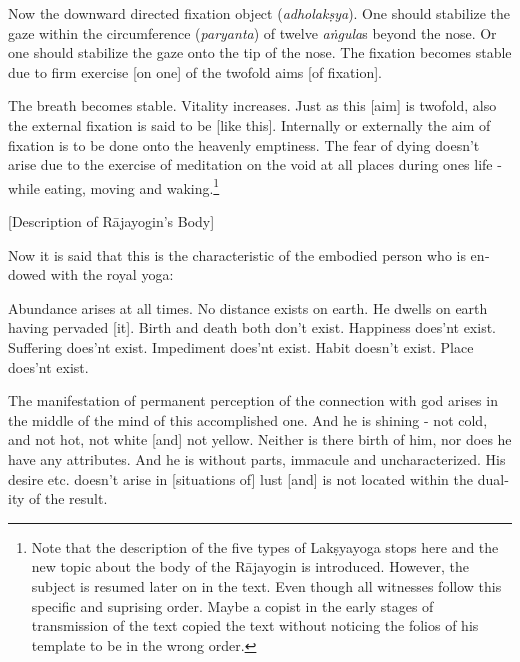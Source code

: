 \begin{otherlanguage}{english}
    \bigskip
  \begin{tlate}
    Now the downward directed fixation object (\textit{adholakṣya}). One should stabilize the gaze within the circumference (\textit{paryanta}) of twelve \textit{aṅgula}s beyond the nose. Or one should stabilize the gaze onto the tip of the nose. The fixation becomes stable due to firm exercise [on one] of the twofold aims [of fixation].
    \end{tlate}
  \begin{tlate}
The breath becomes stable. Vitality increases. Just as this [aim] is twofold, also the external fixation is said to be [like this]. Internally or externally the aim of fixation is to be done onto the heavenly emptiness. The fear of dying doesn't arise due to the exercise of meditation on the void at all places during ones life - while eating, moving and waking.\footnote{Note that the description of the five types of Lakṣyayoga stops here and the new topic about the body of the Rājayogin is introduced. However, the subject is resumed later on in the text. Even though all witnesses follow this specific and suprising order. Maybe a copist in the early stages of transmission of the text copied the text without noticing the folios of his template to be in the wrong order.}
  \end{tlate}
          \bigskip
    \centerline{\textrm{\small{[Description of Rājayogin's Body]}}}
    \bigskip
      \begin{tlate}
Now it is said that this is the characteristic of the embodied person who is endowed with the royal yoga:
      \end{tlate}
    \begin{tlate}
Abundance arises at all times. No distance exists on earth. He dwells on earth having pervaded [it]. Birth and death both don't exist. Happiness does'nt exist. Suffering does'nt exist. Impediment does'nt exist. Habit doesn't exist. Place does'nt exist.
    \end{tlate}
    \begin{tlate}
The manifestation of permanent perception of the connection with god arises in the middle of the mind of this accomplished one. And he is shining - not cold, and not hot, not white [and] not yellow. Neither is there birth of him, nor does he have any attributes. And he is without parts, immacule and uncharacterized. His desire etc. doesn't arise in [situations of] lust [and] is not located within the duality of the result.

\end{tlate}
\end{otherlanguage}
